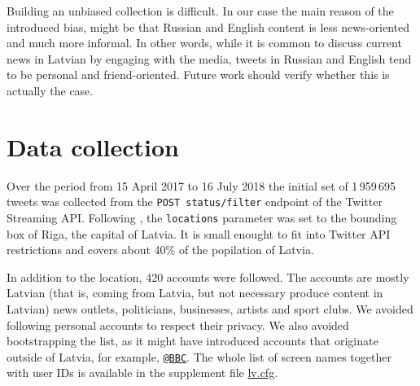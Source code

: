 \documentclass{IOS-Book-Article}
\makeatletter
\newcommand{\hl}[1]{#1}
\newcommand{\sn}[1]{\href{https://twitter.com/#1}{\texttt{@#1}}}
\newcommand{\zenodoBase}{https://zenodo.org/record/1313732}
\newcommand{\sfile}[1]{\href{\zenodoBase/files/#1}{#1}}
\makeatother
\begin{document}

Building an unbiased collection is difficult.  In our case the main reason of the introduced bias, might be that Russian and English content is less news-oriented and much more informal. In other words, while it is common to discuss current news in Latvian by engaging with the media, tweets in Russian and English tend to be personal and friend-oriented. Future work should verify whether this is actually the case.

\section{Data collection}
\label{sec:data-collection}



Over the period from 15 April 2017 to \hl{16 July 2018} the initial set of \hl{1\,959\,695} tweets was collected from the \texttt{POST status/filter} endpoint of the Twitter Streaming API. Following \cite{milajevs:2017:BUCC}, the \texttt{locations} parameter was set to the bounding box of Riga, the capital of Latvia. It is small enought to fit into Twitter API restrictions and covers about 40\% of the popilation of Latvia.\footnotemark{}
%

In addition to the location, 420 accounts were followed.\footnotemark{} The accounts are mostly Latvian (that is, coming from Latvia, but not necessary produce content in Latvian) news outlets, politicians, businesses, artists and sport clubs. We avoided following personal accounts to respect their privacy. We also avoided bootstrapping the list, as it might have introduced accounts that originate outside of Latvia, for example, \sn{BBC}. The whole list of screen names together with user IDs is available in the supplement file \sfile{lv.cfg}.

\end{document}
